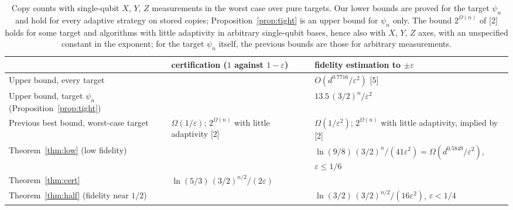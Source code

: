 \documentclass[11pt]{article}
\theoremstyle{remark}
\newcommand{\eps}{\varepsilon}
\begin{document}
\begin{table}[h]
\centering
\small
\begin{tabular}{@{}>{\raggedright\arraybackslash}p{}>{\raggedright\arraybackslash}p{}>{\raggedright\arraybackslash}p{}@{}}
\toprule
 & certification ($1$ against $1-\eps$) & fidelity estimation to $\pm\eps$ \\
\midrule
Upper bound, every target & & $O(d^{0.7716}/\eps^2)$ [5] \\
Upper bound, target $\psi_n$ (Proposition~\ref{prop:tight}) & & $13.5\,(3/2)^n/\eps^2$ \\
Previous best bound, worst-case target & $\Omega(1/\eps)$; $2^{\Omega(n)}$ with little adaptivity [2] & $\Omega(1/\eps^2)$; $2^{\Omega(n)}$ with little adaptivity, implied by [2] \\
Theorem~\ref{thm:low} (low fidelity) & & $\ln(9/8)\,(3/2)^n/(41\eps^2) = \Omega(d^{0.5849}/\eps^2)$, $\eps\le1/6$ \\
Theorem~\ref{thm:cert} & $\ln(5/3)\,(3/2)^{n/2}/(2\eps)$ & \\
Theorem~\ref{thm:half} (fidelity near $1/2$) & & $\ln(3/2)\,(3/2)^{n/2}/(16\eps^2)$, $\eps<1/4$ \\
\bottomrule
\end{tabular}
\caption{Copy counts with single-qubit $X$, $Y$, $Z$ measurements in the worst case over pure targets. Our lower bounds are proved for the target $\psi_n$ and hold for every adaptive strategy on stored copies; Proposition~\ref{prop:tight} is an upper bound for $\psi_n$ only. The bound $2^{\Omega(n)}$ of [2] holds for some target and algorithms with little adaptivity in arbitrary single-qubit bases, hence also with $X$, $Y$, $Z$ axes, with an unspecified constant in the exponent; for the target $\psi_n$ itself, the previous bounds are those for arbitrary measurements.}
\label{tab:results}
\end{table}
\end{document}
